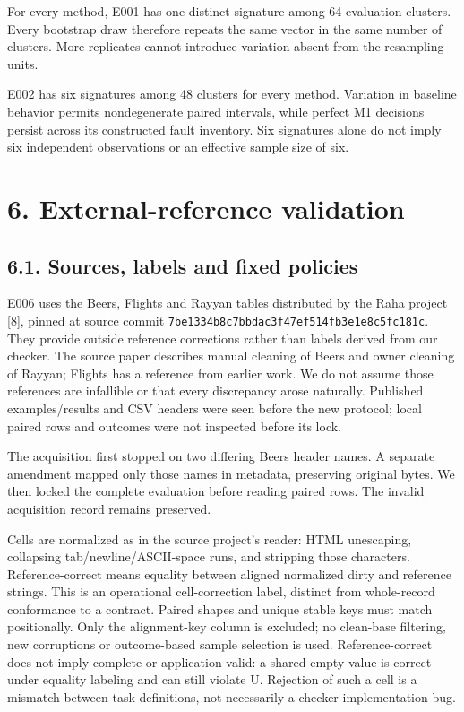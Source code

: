 For every method, E001 has one distinct signature among 64 evaluation
clusters. Every bootstrap draw therefore repeats the same vector in the
same number of clusters. More replicates cannot introduce variation
absent from the resampling units.

E002 has six signatures among 48 clusters for every method. Variation in
baseline behavior permits nondegenerate paired intervals, while perfect
M1 decisions persist across its constructed fault inventory. Six
signatures alone do not imply six independent observations or an
effective sample size of six.

\hypertarget{external-reference-validation}{%
\section{6. External-reference
validation}\label{external-reference-validation}}

\hypertarget{sources-labels-and-fixed-policies}{%
\subsection{6.1. Sources, labels and fixed
policies}\label{sources-labels-and-fixed-policies}}

E006 uses the Beers, Flights and Rayyan tables distributed by the Raha
project {[}8{]}, pinned at source commit
\texttt{7be1334b8c7bbdac3f47ef514fb3e1e8c5fc181c}. They provide outside
reference corrections rather than labels derived from our checker. The
source paper describes manual cleaning of Beers and owner cleaning of
Rayyan; Flights has a reference from earlier work. We do not assume
those references are infallible or that every discrepancy arose
naturally. Published examples/results and CSV headers were seen before
the new protocol; local paired rows and outcomes were not inspected
before its lock.

The acquisition first stopped on two differing Beers header names. A
separate amendment mapped only those names in metadata, preserving
original bytes. We then locked the complete evaluation before reading
paired rows. The invalid acquisition record remains preserved.

Cells are normalized as in the source project's reader: HTML unescaping,
collapsing tab/newline/ASCII-space runs, and stripping those characters.
Reference-correct means equality between aligned normalized dirty and
reference strings. This is an operational cell-correction label,
distinct from whole-record conformance to a contract. Paired shapes and
unique stable keys must match positionally. Only the alignment-key
column is excluded; no clean-base filtering, new corruptions or
outcome-based sample selection is used. Reference-correct does not imply
complete or application-valid: a shared empty value is correct under
equality labeling and can still violate U. Rejection of such a cell is a
mismatch between task definitions, not necessarily a checker
implementation bug.

